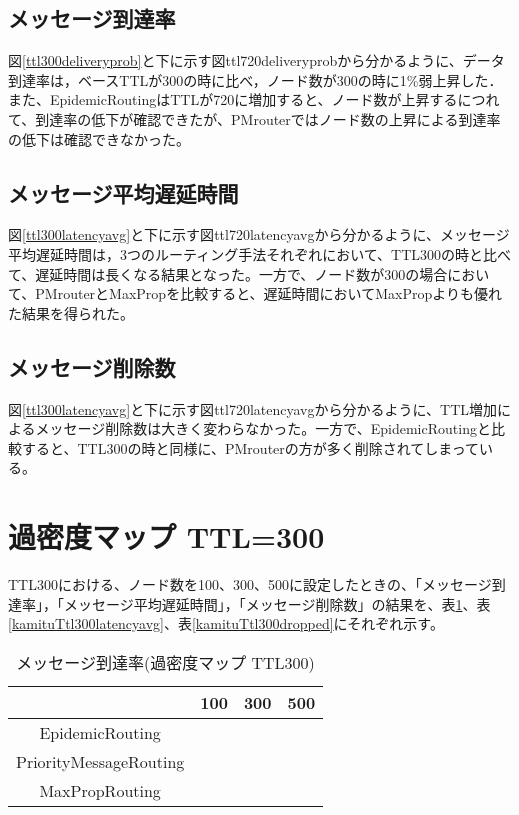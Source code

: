 \documentclass[11pt]{icsthesis}
\begin{document}
\subsection{メッセージ到達率}
図\ref{ttl300deliveryprob}と下に示す図{ttl720deliveryprob}から分かるように、データ到達率は，ベースTTLが300の時に比べ，ノード数が300の時に1\%弱上昇した．また、EpidemicRoutingはTTLが720に増加すると、ノード数が上昇するにつれて、到達率の低下が確認できたが、PMrouterではノード数の上昇による到達率の低下は確認できなかった。


\subsection{メッセージ平均遅延時間}
図\ref{ttl300latencyavg}と下に示す図{ttl720latencyavg}から分かるように、メッセージ平均遅延時間は，3つのルーティング手法それぞれにおいて、TTL300の時と比べて、遅延時間は長くなる結果となった。一方で、ノード数が300の場合において、PMrouterとMaxPropを比較すると、遅延時間においてMaxPropよりも優れた結果を得られた。


\subsection{メッセージ削除数}
図\ref{ttl300latencyavg}と下に示す図{ttl720latencyavg}から分かるように、TTL増加によるメッセージ削除数は大きく変わらなかった。一方で、EpidemicRoutingと比較すると、TTL300の時と同様に、PMrouterの方が多く削除されてしまっている。




\section{過密度マップ TTL=300}
TTL300における、ノード数を100、300、500に設定したときの、「メッセージ到達率」，「メッセージ平均遅延時間」，「メッセージ削除数」の結果を、表\ref{kamituTtl300deliveryprob}、表\ref{kamituTtl300latencyavg}、表\ref{kamituTtl300dropped}にそれぞれ示す。
\begin{table}[H]
 \begin{center}
      \caption[]{メッセージ到達率(過密度マップ TTL300)}
      \label{kamituTtl300deliveryprob}
      \begin{tabular}{|c|c|c|c|}
\hline
&100&300&500\\
\hline
EpidemicRouting&&&\\
\hline
PriorityMessageRouting&&&\\
\hline
MaxPropRouting&&&\\
\hline
      \end{tabular}
    \end{center}
\end{table}
\end{document}
